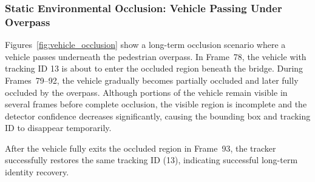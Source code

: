 \subsubsection{Static Environmental Occlusion: Vehicle Passing Under Overpass}

Figures~\ref{fig:vehicle_occlusion} show a long-term occlusion scenario where a vehicle passes underneath the pedestrian overpass. In Frame~78, the vehicle with tracking ID 13 is about to enter the occluded region beneath the bridge. During Frames~79--92, the vehicle gradually becomes partially occluded and later fully occluded by the overpass. Although portions of the vehicle remain visible in several frames before complete occlusion, the visible region is incomplete and the detector confidence decreases significantly, causing the bounding box and tracking ID to disappear temporarily.

After the vehicle fully exits the occluded region in Frame~93, the tracker successfully restores the same tracking ID (13), indicating successful long-term identity recovery.

